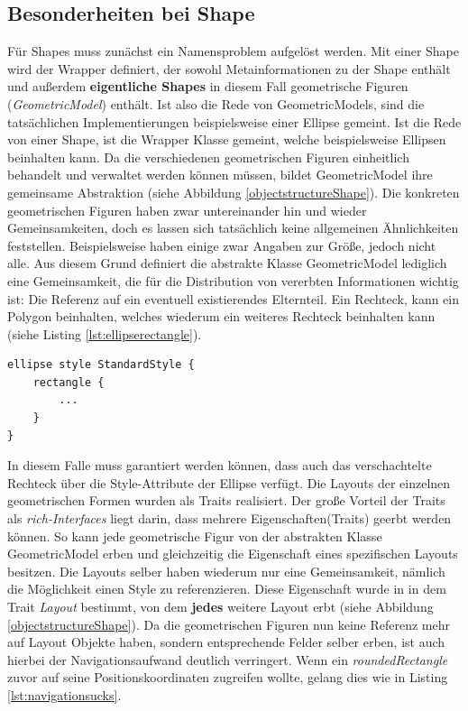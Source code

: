 \subsection{Besonderheiten bei Shape}
Für Shapes muss zunächst ein Namensproblem aufgelöst werden. Mit einer Shape wird der Wrapper definiert, der sowohl Metainformationen zu der Shape enthält und außerdem \textbf{eigentliche Shapes} in diesem Fall geometrische Figuren (\textit{GeometricModel}) enthält. Ist also die Rede von GeometricModels, sind die tatsächlichen Implementierungen beispielsweise einer Ellipse gemeint. Ist die Rede von einer Shape, ist die Wrapper Klasse gemeint, welche beispielsweise Ellipsen beinhalten kann. Da die verschiedenen geometrischen Figuren einheitlich behandelt und verwaltet werden können müssen, bildet GeometricModel ihre gemeinsame Abstraktion (siehe Abbildung \ref{objectstructureShape}). Die konkreten geometrischen Figuren haben zwar untereinander hin und wieder Gemeinsamkeiten, doch es lassen sich tatsächlich keine allgemeinen Ähnlichkeiten feststellen. Beispielsweise haben einige zwar Angaben zur Größe, jedoch nicht alle. Aus diesem Grund definiert die abstrakte Klasse GeometricModel lediglich eine Gemeinsamkeit, die für die Distribution von vererbten Informationen wichtig ist: Die Referenz auf ein eventuell existierendes Elternteil. Ein Rechteck, kann ein Polygon beinhalten, welches wiederum ein weiteres Rechteck beinhalten kann (siehe Listing \ref{lst:ellipserectangle}).
\begin{lstlisting}[style=spray, caption = {Beispiel Ellipse die einer Styleregel unterliegt und ein Rechteck beinhaltet}, label = {lst:ellipserectangle}]
ellipse style StandardStyle {
    rectangle {
        ...
    }
}
\end{lstlisting}
In diesem Falle muss garantiert werden können, dass auch das verschachtelte Rechteck über die Style-Attribute der Ellipse verfügt.
Die Layouts der einzelnen geometrischen Formen wurden als Traits realisiert. Der große Vorteil der Traits als \textit{rich-Interfaces} liegt darin, dass mehrere Eigenschaften(Traits) geerbt werden können. So kann jede geometrische Figur von der abstrakten Klasse GeometricModel erben und gleichzeitig die Eigenschaft eines spezifischen Layouts besitzen.
Die Layouts selber haben wiederum nur eine Gemeinsamkeit, nämlich die Möglichkeit einen Style zu referenzieren. Diese Eigenschaft wurde in in dem Trait \textit{Layout} bestimmt, von dem \textbf{jedes} weitere Layout erbt (siehe Abbildung \ref{objectstructureShape}). Da die geometrischen Figuren nun keine Referenz mehr auf Layout Objekte haben, sondern entsprechende Felder selber erben, ist auch hierbei der Navigationsaufwand deutlich verringert. Wenn ein \textit{roundedRectangle} zuvor auf seine Positionskoordinaten zugreifen wollte, gelang dies wie in Listing \ref{lst:navigationsucks}.
